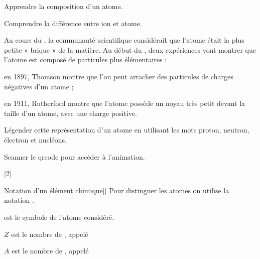 \teteSndAtom



\begin{objectifs}
  \item Apprendre la composition d'un atome.
  \item Comprendre la différence entre ion et atome.
\end{objectifs}

\begin{contexte}
  Au cours du , la communauté scientifique considérait que l'atome était la plus petite « brique  » de la matière.
  Au début du , deux expériences vont montrer que l'atome est composé de particules plus élémentaires :
  \begin{listePoints}
    \item en 1897, Thomson montre que l'on peut arracher des particules de charges négatives d'un atome ;
    \item en 1911, Rutherford montre que l'atome possède un noyau très petit devant la taille d'un atome, avec une charge positive.
  \end{listePoints}
  
\end{contexte}



\numeroQuestion
Légender cette représentation d'un atome en utilisant les mots proton, neutron, électron et nucléons.

\begin{center}
\end{center}


\telechargement Scanner le qrcode pour accéder à l'animation.

[2]

\begin{doc}{Notation d'un élément chimique}[\label{doc:notation_element}]
  Pour distinguer les atomes on utilise la notation .
  \begin{importants}
    \begin{listePoints}
      \item {} est le symbole de l'atome considéré.
      \item $Z$ est le nombre de , appelé 
      \item $A$ est le nombre de , appelé 
    \end{listePoints}
  \end{importants}
\end{doc}

